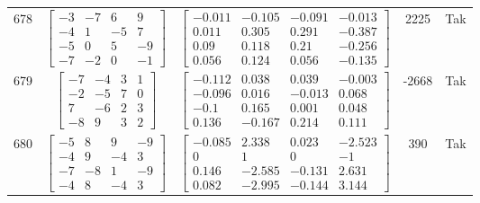 \documentclass[a4paper,12pt]{article}
\begin{document}
\begin{tabular}{c c c c c}
678
&
$\begin{bmatrix} -3 & -7 & 6 & 9 \\ -4 & 1 & -5 & 7 \\ -5 & 0 & 5 & -9 \\ -7 & -2 & 0 & -1 \end{bmatrix}$
&
$\begin{bmatrix} -0.011 & -0.105 & -0.091 & -0.013 \\ 0.011 & 0.305 & 0.291 & -0.387 \\ 0.09 & 0.118 & 0.21 & -0.256 \\ 0.056 & 0.124 & 0.056 & -0.135 \end{bmatrix}$
&
2225
&
Tak
\\
679
&
$\begin{bmatrix} -7 & -4 & 3 & 1 \\ -2 & -5 & 7 & 0 \\ 7 & -6 & 2 & 3 \\ -8 & 9 & 3 & 2 \end{bmatrix}$
&
$\begin{bmatrix} -0.112 & 0.038 & 0.039 & -0.003 \\ -0.096 & 0.016 & -0.013 & 0.068 \\ -0.1 & 0.165 & 0.001 & 0.048 \\ 0.136 & -0.167 & 0.214 & 0.111 \end{bmatrix}$
&
-2668
&
Tak
\\
680
&
$\begin{bmatrix} -5 & 8 & 9 & -9 \\ -4 & 9 & -4 & 3 \\ -7 & -8 & 1 & -9 \\ -4 & 8 & -4 & 3 \end{bmatrix}$
&
$\begin{bmatrix} -0.085 & 2.338 & 0.023 & -2.523 \\ 0 & 1 & 0 & -1 \\ 0.146 & -2.585 & -0.131 & 2.631 \\ 0.082 & -2.995 & -0.144 & 3.144 \end{bmatrix}$
&
390
&
Tak
\\
\end{tabular} \egroup \newpage
\end{document}
